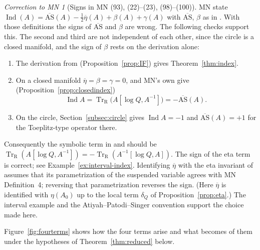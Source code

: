 \documentclass[11pt,oneside,reqno]{article}
\DeclareMathOperator{\Tr}{Tr}
\DeclareMathOperator{\Ind}{Ind}
\newcommand{\TrR}{\Tr_{\mathrm R}}
\newcommand{\lQ}{\log Q}
\newcommand{\bAS}{\overline{\mathrm{AS}}}
\newcommand{\etab}{\overline\eta}
\theoremstyle{plain}
\theoremstyle{definition}
\theoremstyle{remark}
\newtheorem{correction}[theorem]{Correction to MN}
\begin{document}
\begin{correction}[Signs in MN (93), (22)--(23), (98)--(100)]
\label{corr:ASsign}
MN state \(\Ind(A)=\bAS(A)-\frac12\etab(A)+\beta(A)+\gamma(A)\) with
\(\bAS\), \(\beta\) as in \cite[(90), (91)]{MN}. With those definitions
the signs of \(\bAS\) and \(\beta\) are wrong. The following checks support
this. The second and third are not independent of each other, since the
circle is a closed manifold, and the sign of \(\beta\) rests on the
derivation alone:
\begin{enumerate}
\item The derivation from \cite[(87)]{MN} (Proposition~\ref{prop:IF})
gives Theorem~\ref{thm:index}.
\item On a closed manifold \(\etab=\beta=\gamma=0\), and MN's own
\cite[(3), (5)]{MN} give (Proposition~\ref{prop:closedindex})
\[
 \Ind A=\TrR\bigl(A[\lQ,A^{-1}]\bigr)=-\bAS(A).
\]
\item On the circle, Section~\ref{subsec:circle} gives \(\Ind A=-1\)
and \(\bAS(A)=+1\) for the Toeplitz-type operator there.
\end{enumerate}
Consequently the symbolic term in \cite[(23)]{MN} and \cite[(100)]{MN}
should be \(\TrR(A[\lQ,A^{-1}])=-\TrR(A^{-1}[\lQ,A])\). The sign of the
eta term is correct; see Example~\ref{ex:interval-index}. Identifying
\(\etab\) with the eta invariant of \cite{MelroseEta} assumes that its
parametrization of the suspended variable agrees with MN Definition~4;
reversing that parametrization reverses the sign. (Here \(\etab\) is
identified with \(\eta(A_0)\) up to the local term \(\delta_Q\) of
Proposition~\ref{prop:eta}.) The interval example
and the Atiyah--Patodi--Singer convention support the choice made here.
\end{correction}

Figure~\ref{fig:fourterms} shows how the four terms arise and what
becomes of them under the hypotheses of Theorem~\ref{thm:reduced} below.
\end{document}
